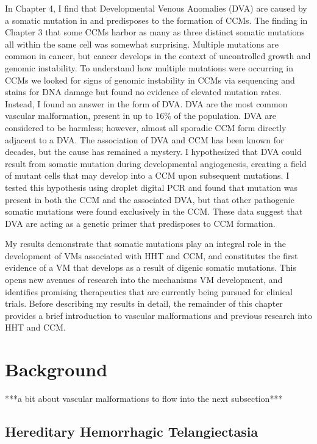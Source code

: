 In Chapter 4, I find that Developmental Venous Anomalies (DVA) are caused by a somatic mutation in  and predisposes to the formation of CCMs. The finding in Chapter 3 that some CCMs harbor as many as three distinct somatic mutations all within the same cell was somewhat surprising. Multiple mutations are common in cancer, but cancer develops in the context of uncontrolled growth and genomic instability. To understand how multiple mutations were occurring in CCMs we looked for signs of genomic instability in CCMs via sequencing and stains for DNA damage but found no evidence of elevated mutation rates. Instead, I found an answer in the form of DVA. DVA are the most common vascular malformation, present in up to 16\% of the population. DVA are considered to be harmless; however, almost all sporadic CCM form directly adjacent to a DVA. The association of DVA and CCM has been known for decades, but the cause has remained a mystery. I hypothesized that DVA could result from somatic  mutation during developmental angiogenesis, creating a field of mutant cells that may develop into a CCM upon subsequent mutations. I tested this hypothesis using droplet digital PCR and found that  mutation was present in both the CCM and the associated DVA, but that other pathogenic somatic mutations were found exclusively in the CCM. These data suggest that DVA are acting as a genetic primer that predisposes to CCM formation.

My results demonstrate that somatic mutations play an integral role in the development of VMs associated with HHT and CCM, and constitutes the first evidence of a VM that develops as a result of digenic somatic mutations. This opens new avenues of research into the mechanisms VM development, and identifies promising therapeutics that are currently being pursued for clinical trials. Before describing my results in detail, the remainder of this chapter provides a brief introduction to vascular malformations and previous research into HHT and CCM.





\section{Background}
***a bit about vascular malformations to flow into the next subsection***

\subsection{Hereditary Hemorrhagic Telangiectasia}


